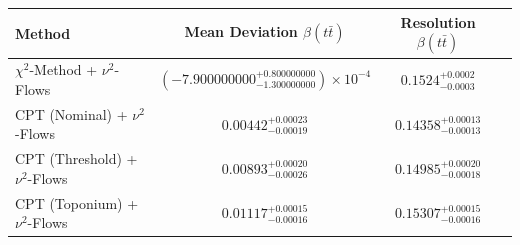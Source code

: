     \begin{tabular}{lccc}
        \toprule
        Method & Mean Deviation $\beta(t\bar{t})$ & Resolution $\beta(t\bar{t})$ \\
        \midrule
        $\chi^2$-Method + $\nu^2$-Flows & $(-7.900000000^{+0.800000000}_{-1.300000000})\times 10^{-4}$ & $0.1524^{+0.0002}_{-0.0003}$ \\
        CPT (Nominal) + $\nu^2$-Flows & $0.00442^{+0.00023}_{-0.00019}$ & $0.14358^{+0.00013}_{-0.00013}$ \\
        CPT (Threshold) + $\nu^2$-Flows & $0.00893^{+0.00020}_{-0.00026}$ & $0.14985^{+0.00020}_{-0.00018}$ \\
        CPT (Toponium) + $\nu^2$-Flows & $0.01117^{+0.00015}_{-0.00016}$ & $0.15307^{+0.00015}_{-0.00016}$ \\
        \bottomrule
    \end{tabular}